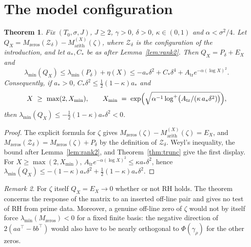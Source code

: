 \documentclass[11pt]{amsart}
\newtheorem{theorem}{Theorem}[section]
\theoremstyle{definition}
\theoremstyle{remark}
\newtheorem{remark}[theorem]{Remark}
\newcommand{\lmin}{\lambda_{\min}}
\newcommand{\Atr}{A_{\mathrm{tr}}}
\begin{document}
\section{The model configuration}\label{sec:detector}

\begin{theorem}\label{thm:detector}
Fix $(T_0,\sigma,J)$, $J\ge2$, $\gamma>0$, $\delta>0$, $\kappa\in(0,1)$ and
$\alpha<\sigma^2/4$. Let
$Q_X=M_{\mathrm{zeros}}(\mathcal Z_\delta)-M^{(X)}_{\mathrm{arith}}(\zeta)$,
where $\mathcal Z_\delta$ is the configuration of the introduction, and let
$a_*,C_*$ be as after Lemma~\ref{lem:rank2}. Then $Q_X=P_\delta+E_X$ and
\[
\lmin(Q_X)\le\lmin(P_\delta)+\eta(X)\le-a_*\delta^{2}+C_*\delta^{4}+\Atr e^{-\alpha(\log X)^{2}}.
\]
Consequently, if $a_*>0$, $C_*\delta^{2}\le\tfrac12(1-\kappa)a_*$ and
\begin{equation}\label{eq:Xmin}
  X\ \ge\ \max(2,X_{\min}),\qquad X_{\min}
  \;=\;\exp\Bigl(\sqrt{\alpha^{-1}\log^{+}\bigl(\Atr/(\kappa\,a_*\delta^{2})\bigr)}\Bigr),
\end{equation}
then $\lmin(Q_X)\le-\tfrac12(1-\kappa)a_*\delta^{2}<0$.
\end{theorem}

\begin{proof}
The explicit formula for $\zeta$ gives
$M_{\mathrm{zeros}}(\zeta)-M^{(X)}_{\mathrm{arith}}(\zeta)=E_X$, and
$M_{\mathrm{zeros}}(\mathcal Z_\delta)=M_{\mathrm{zeros}}(\zeta)+P_\delta$
by the definition of $\mathcal Z_\delta$. Weyl's inequality, the bound after
Lemma~\ref{lem:rank2}, and Theorem~\ref{thm:trunc} give the first display.
For $X\ge\max(2,X_{\min})$, $\Atr e^{-\alpha(\log X)^2}\le\kappa a_*\delta^2$, hence
$\lmin(Q_X)\le-(1-\kappa)a_*\delta^2+\tfrac12(1-\kappa)a_*\delta^2$.
\end{proof}

\begin{remark}
For $\zeta$ itself $Q_X=E_X\to0$ whether or not RH holds. The theorem
concerns the response of the matrix to an inserted off-line pair and gives
no test of RH from prime data. Moreover, a genuine off-line zero of $\zeta$
would not by itself force $\lmin(M_{\mathrm{zeros}})<0$ for a fixed finite
basis: the negative direction of $2(aa^{\top}-bb^{\top})$ would also have to
be nearly orthogonal to $\Phi(\gamma_\rho)$ for the other zeros.
\end{remark}
\end{document}
